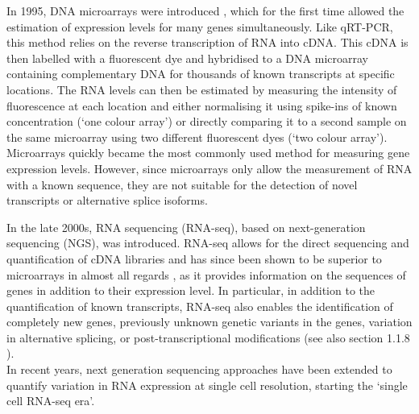 In 1995, DNA microarrays were introduced \cite{schena1995quantitative}, which for the first time allowed the estimation of expression levels for many genes simultaneously.
Like qRT-PCR, this method relies on the reverse transcription of RNA into cDNA.
This cDNA is then labelled with a fluorescent dye and hybridised to a DNA microarray containing complementary DNA for thousands of known transcripts at specific locations. 
The RNA levels can then be estimated by measuring the intensity of fluorescence at each location and either normalising it using spike-ins of known concentration (`one colour array') or directly comparing it to a second sample on the same microarray using two different fluorescent dyes (`two colour array').
Microarrays quickly became the most commonly used method for measuring gene expression levels. 
However, since microarrays only allow the measurement of RNA with a known sequence, they are not suitable for the detection of novel transcripts or alternative splice isoforms. 

In the late 2000s, RNA sequencing (RNA-seq), based on next-generation sequencing (NGS), 
was introduced.
RNA-seq allows for the direct sequencing and quantification of cDNA libraries \cite{mortazavi2008mapping} and has since been shown to be superior to microarrays in almost all regards 
\cite{marioni2008rna}, as it provides information on the sequences of genes in addition to their expression level.
In particular, in addition to the quantification of known transcripts, RNA-seq also enables the identification of completely new genes, previously unknown genetic variants in the genes, variation in alternative splicing, or post-transcriptional modifications (see also section 
1.1.8
). \\

In recent years, next generation sequencing approaches have been extended to quantify variation in RNA expression at single cell resolution, starting the `single cell RNA-seq era'.


